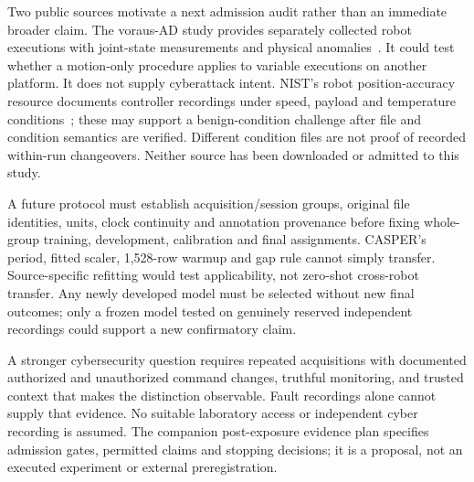 Two public sources motivate a next admission audit rather than an immediate broader claim. The voraus-AD study provides separately collected robot executions with joint-state measurements and physical anomalies~\cite{voraus2024}. It could test whether a motion-only procedure applies to variable executions on another platform. It does not supply cyberattack intent. NIST's robot position-accuracy resource documents controller recordings under speed, payload and temperature conditions~\cite{nistdata}; these may support a benign-condition challenge after file and condition semantics are verified. Different condition files are not proof of recorded within-run changeovers. Neither source has been downloaded or admitted to this study.

A future protocol must establish acquisition/session groups, original file identities, units, clock continuity and annotation provenance before fixing whole-group training, development, calibration and final assignments. CASPER's period, fitted scaler, 1,528-row warmup and gap rule cannot simply transfer. Source-specific refitting would test applicability, not zero-shot cross-robot transfer. Any newly developed model must be selected without new final outcomes; only a frozen model tested on genuinely reserved independent recordings could support a new confirmatory claim.

A stronger cybersecurity question requires repeated acquisitions with documented authorized and unauthorized command changes, truthful monitoring, and trusted context that makes the distinction observable. Fault recordings alone cannot supply that evidence. No suitable laboratory access or independent cyber recording is assumed. The companion post-exposure evidence plan specifies admission gates, permitted claims and stopping decisions; it is a proposal, not an executed experiment or external preregistration.

